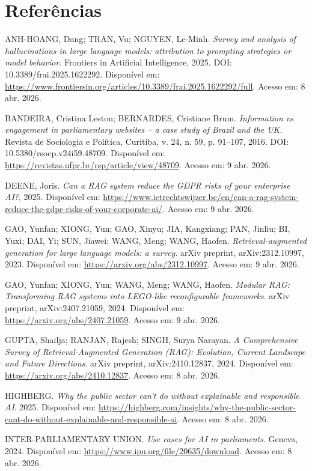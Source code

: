 \section*{Referências}

\small
ANH-HOANG, Dang; TRAN, Vu; NGUYEN, Le-Minh. \textit{Survey and analysis of hallucinations in large language models: attribution to prompting strategies or model behavior}. Frontiers in Artificial Intelligence, 2025. DOI: 10.3389/frai.2025.1622292. Disponível em: \url{https://www.frontiersin.org/articles/10.3389/frai.2025.1622292/full}. Acesso em: 8 abr. 2026.

BANDEIRA, Cristina Leston; BERNARDES, Cristiane Brum. \textit{Information vs engagement in parliamentary websites -- a case study of Brazil and the UK}. Revista de Sociologia e Política, Curitiba, v. 24, n. 59, p. 91--107, 2016. DOI: 10.5380/rsocp.v24i59.48709. Disponível em: \url{https://revistas.ufpr.br/rsp/article/view/48709}. Acesso em: 9 abr. 2026.

DEENE, Joris. \textit{Can a RAG system reduce the GDPR risks of your enterprise AI?}, 2025. Disponível em: \url{https://www.ictrechtswijzer.be/en/can-a-rag-system-reduce-the-gdpr-risks-of-your-corporate-ai/}. Acesso em: 9 abr. 2026.

GAO, Yunfan; XIONG, Yun; GAO, Xinyu; JIA, Kangxiang; PAN, Jinliu; BI, Yuxi; DAI, Yi; SUN, Jiawei; WANG, Meng; WANG, Haofen. \textit{Retrieval-augmented generation for large language models: a survey}. arXiv preprint, arXiv:2312.10997, 2023. Disponível em: \url{https://arxiv.org/abs/2312.10997}. Acesso em: 9 abr. 2026.

GAO, Yunfan; XIONG, Yun; WANG, Meng; WANG, Haofen. \textit{Modular RAG: Transforming RAG systems into LEGO-like reconfigurable frameworks}. arXiv preprint, arXiv:2407.21059, 2024. Disponível em: \url{https://arxiv.org/abs/2407.21059}. Acesso em: 9 abr. 2026.

GUPTA, Shailja; RANJAN, Rajesh; SINGH, Surya Narayan. \textit{A Comprehensive Survey of Retrieval-Augmented Generation (RAG): Evolution, Current Landscape and Future Directions}. arXiv preprint, arXiv:2410.12837, 2024. Disponível em: \url{https://arxiv.org/abs/2410.12837}. Acesso em: 8 abr. 2026.

HIGHBERG. \textit{Why the public sector can't do without explainable and responsible AI}. 2025. Disponível em: \url{https://highberg.com/insights/why-the-public-sector-cant-do-without-explainable-and-responsible-ai}. Acesso em: 8 abr. 2026.

INTER-PARLIAMENTARY UNION. \textit{Use cases for AI in parliaments}. Geneva, 2024. Disponível em: \url{https://www.ipu.org/file/20635/download}. Acesso em: 8 abr. 2026.

